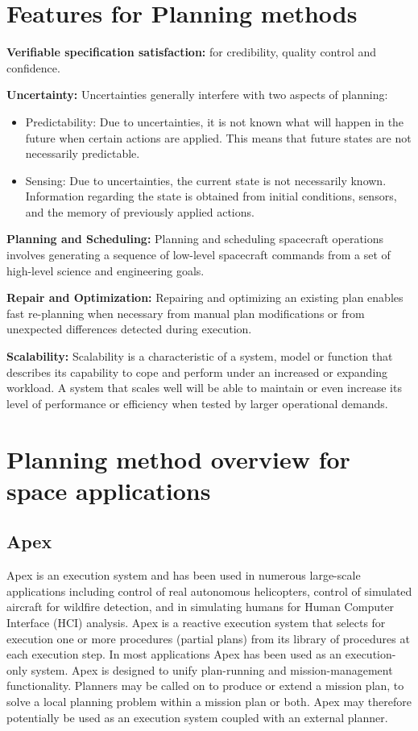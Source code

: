 \documentclass[conference]{IEEEtran}
\begin{document}
\section{Features for Planning methods}
\textbf{Verifiable specification satisfaction: }
for credibility, quality control and confidence.

\textbf{Uncertainty: }
Uncertainties generally interfere with two aspects of planning:
\begin{itemize}
\item Predictability: Due to uncertainties, it is not known what will happen in the future when certain actions are applied. This means that future states are not necessarily predictable.
\item Sensing: Due to uncertainties, the current state is not necessarily known. Information regarding the state is obtained from initial conditions, sensors, and the memory of previously applied actions.
\end{itemize}

\textbf{Planning and Scheduling: }
Planning and scheduling spacecraft operations involves generating a sequence of low-level spacecraft commands from a set of high-level science and engineering goals.

\textbf{Repair and Optimization: }
Repairing and optimizing an existing plan enables fast re-planning when necessary from manual plan modifications or from unexpected differences detected during execution.

\textbf{Scalability: }
Scalability is a characteristic of a system, model or function that describes its capability to cope and perform under an increased or expanding workload. A system that scales well will be able to maintain or even increase its level of performance or efficiency when tested by larger operational demands.

\section{Planning method overview for space applications}

\subsection{\textbf{Apex}}\label{sec:apex}
Apex is an execution system and has been used in numerous large-scale applications including control of real autonomous helicopters, control of simulated aircraft for wildfire detection, and in simulating humans for Human Computer Interface (HCI) analysis.
Apex is a reactive execution system that selects for execution one or more procedures (partial plans) from its library of procedures at each execution step. In most applications Apex has been used as an execution-only system. Apex is designed to unify plan-running and mission-management functionality. Planners may be called on to produce or extend a mission plan, to solve a local planning problem within a mission plan or both. Apex may therefore potentially be used as an execution system coupled with an external planner.
\end{document}
